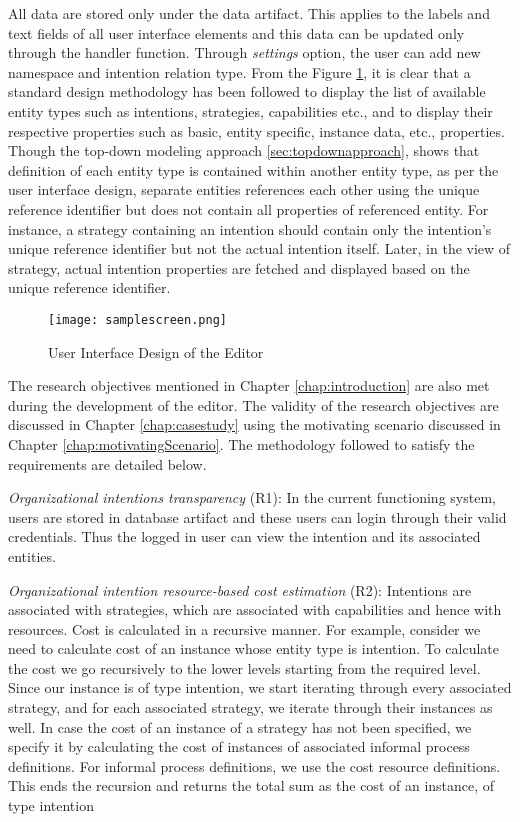 All data are stored only under the data artifact. This applies to the labels and text fields of all user interface elements and this data can be updated only through the handler function. Through \textit{settings} option, the user can add new namespace and intention relation type. From the Figure \ref{fig:samplescreen}, it is clear that a standard design methodology has been followed to display the list of available entity types such as intentions, strategies, capabilities etc., and to display their respective properties such as basic, entity specific, instance data, etc., properties. Though the top-down modeling approach \ref{sec:topdownapproach}, shows that definition of each entity type is contained within another entity type, as per the user interface design, separate entities references each other using the unique reference identifier but does not contain all properties of referenced entity. For instance, a strategy containing an intention should contain only the intention's unique reference identifier but not the actual intention itself. Later, in the view of strategy, actual intention properties are fetched and displayed based on the unique reference identifier. 

\begin{figure}
	\centering
	\texttt{[image: samplescreen.png]}
	\caption{User Interface Design of the Editor}
	\label{fig:samplescreen}
\end{figure}

The research objectives mentioned in Chapter \ref{chap:introduction} are also met during the development of the editor. The validity of the research objectives are discussed in Chapter \ref{chap:casestudy} using the motivating scenario discussed in Chapter \ref{chap:motivatingScenario}. The methodology followed to satisfy the requirements are detailed below.

\textit{Organizational intentions transparency} (R1): In the current functioning system, users are stored in database artifact and these users can login through their valid credentials. Thus the logged in user can view the intention and its associated entities.

\textit{Organizational intention resource-based cost estimation} (R2): Intentions are associated with strategies, which are associated with capabilities and hence with resources. Cost is calculated in a recursive manner. For example, consider we need to calculate cost of an instance whose entity type is intention. To calculate the cost we go recursively to the lower levels starting from the required level. Since our instance is of type intention, we start iterating through every associated strategy, and for each associated strategy, we iterate through their instances as well. In case the cost of an instance of a strategy has not been specified, we specify it by calculating the cost of instances of associated informal process definitions. For informal process definitions, we use the cost resource definitions. This ends the recursion and returns the total sum as the cost of an instance, of type intention

